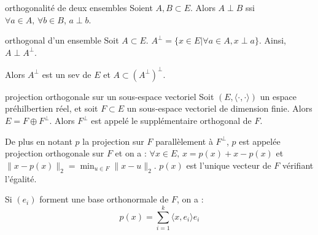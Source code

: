 \begin{definition}{orthogonalité de deux ensembles}{}
    Soient $A, B \subset E$. Alors $A \perp B$ ssi $\forall a \in A, \, \forall b \in B$,
    $a \perp b$.
\end{definition}

\begin{definition}{orthogonal d'un ensemble}{}
    Soit $A \subset E$. $A^\perp = \{x \in E | \forall a \in A, x \perp a\}$. 
    Ainsi, $A \perp A^\perp$. 

    Alors $A^\perp$ est un sev de $E$ et $ A \subset (A^\perp)^\perp$.
\end{definition}

\begin{theoreme}{projection orthogonale sur un sous-espace vectoriel}{}
    Soit $(E, \langle \cdot, \cdot \rangle)$ un espace préhilbertien réel, 
    et soit $F \subset E$ un sous-espace vectoriel de dimension finie. Alors 
    $E = F \oplus F^\perp$. Alors $F^\perp$ est appelé le supplémentaire 
    orthogonal de $F$. 

    De plus en notant $p$ la projection sur $F$ parallèlement à $F^\perp$, $p$ est 
    appelée projection orthogonale sur $F$ et on a : 
    $\forall x \in E, \, x = p(x) + x - p(x)$ et $\| x - p(x) \|_2 = \min_{u \in F} \| x - u \|_2$.
    $p(x)$ est l'unique vecteur de $F$ vérifiant l'égalité. 

    Si $(e_i)$ forment une base orthonormale de $F$, on a : 
    $$ p(x) = \sum_{i = 1}^k \langle x, e_i \rangle e_i$$
\end{theoreme}

